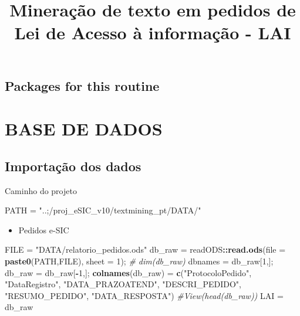 \documentclass[]{article}
\title{Mineração de texto em pedidos de Lei de Acesso à informação - LAI}
\author{}
\date{}
\newenvironment{Shaded}{\begin{snugshade}}{\end{snugshade}}
\newcommand{\KeywordTok}[1]{\textcolor[rgb]{0.13,0.29,0.53}{\textbf{#1}}}
\newcommand{\DataTypeTok}[1]{\textcolor[rgb]{0.13,0.29,0.53}{#1}}
\newcommand{\DecValTok}[1]{\textcolor[rgb]{0.00,0.00,0.81}{#1}}
\newcommand{\StringTok}[1]{\textcolor[rgb]{0.31,0.60,0.02}{#1}}
\newcommand{\CommentTok}[1]{\textcolor[rgb]{0.56,0.35,0.01}{\textit{#1}}}
\newcommand{\OperatorTok}[1]{\textcolor[rgb]{0.81,0.36,0.00}{\textbf{#1}}}
\newcommand{\NormalTok}[1]{#1}
\providecommand{\tightlist}{%
  \setlength{\itemsep}{0pt}\setlength{\parskip}{0pt}}
\begin{document}
\maketitle

\subsection{Packages for this routine}\label{packages-for-this-routine}

\section{BASE DE DADOS}\label{base-de-dados}

\subsection{Importação dos dados}\label{importacao-dos-dados}

Caminho do projeto

\begin{Shaded}
\begin{Highlighting}[]
\NormalTok{PATH = }\StringTok{"..;/proj_eSIC_v10/textmining_pt/DATA/"}
\end{Highlighting}
\end{Shaded}

\begin{itemize}
\tightlist
\item
  Pedidos e-SIC
\end{itemize}

\begin{Shaded}
\begin{Highlighting}[]
\NormalTok{FILE =}\StringTok{ "DATA/relatorio_pedidos.ods"}
\NormalTok{db_raw =}\StringTok{ }\NormalTok{readODS}\OperatorTok{::}\KeywordTok{read.ods}\NormalTok{(}\DataTypeTok{file =} \KeywordTok{paste0}\NormalTok{(PATH,FILE), }\DataTypeTok{sheet =} \DecValTok{1}\NormalTok{); }\CommentTok{# dim(db_raw)}
\NormalTok{dbnames =}\StringTok{ }\NormalTok{db_raw[}\DecValTok{1}\NormalTok{,]; db_raw =}\StringTok{ }\NormalTok{db_raw[}\OperatorTok{-}\DecValTok{1}\NormalTok{,]; }
\KeywordTok{colnames}\NormalTok{(db_raw) =}\StringTok{ }\KeywordTok{c}\NormalTok{(}\StringTok{"ProtocoloPedido"}\NormalTok{, }\StringTok{"DataRegistro"}\NormalTok{, }\StringTok{"DATA_PRAZOATEND"}\NormalTok{, }\StringTok{"DESCRI_PEDIDO"}\NormalTok{,}
                     \StringTok{"RESUMO_PEDIDO"}\NormalTok{, }\StringTok{"DATA_RESPOSTA"}\NormalTok{)}
\CommentTok{#View(head(db_raw))}
\NormalTok{LAI =}\StringTok{ }\NormalTok{db_raw}
\end{Highlighting}
\end{Shaded}
\end{document}
